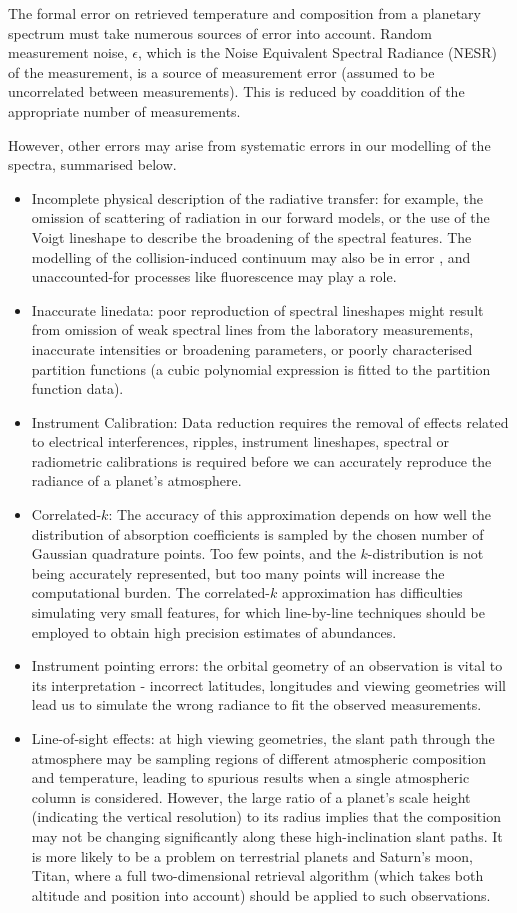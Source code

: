 \documentclass[final,5p,times,twocolumn,authoryear]{elsarticle}
\begin{document}
The formal error on retrieved temperature and composition from a planetary spectrum must take numerous sources of error into account. Random measurement noise, $\epsilon$, which is the Noise Equivalent Spectral Radiance (NESR) of the measurement, is a source of measurement error (assumed to be uncorrelated between measurements).  This is reduced by coaddition of the appropriate number of measurements.

However, other errors may arise from systematic errors in our modelling of the spectra, summarised below.
\begin{itemize}
\item Incomplete physical description of the radiative transfer: for example, the omission of scattering of radiation in our forward models, or the use of the Voigt lineshape to describe the broadening of the spectral features.  The modelling of the collision-induced continuum may also be in error \citep{07orton}, and unaccounted-for processes like fluorescence may play a role.
\item Inaccurate linedata: poor reproduction of spectral lineshapes might result from omission of weak spectral lines from the laboratory measurements, inaccurate intensities or broadening parameters, or poorly characterised partition functions (a cubic polynomial expression is fitted to the partition function data).
\item Instrument Calibration:  Data reduction requires the removal of effects related to electrical interferences, ripples, instrument lineshapes, spectral or radiometric calibrations is required before we can accurately reproduce the radiance of a planet's atmosphere.  
\item Correlated-$k$:  The accuracy of this approximation depends on how well the distribution of absorption coefficients is sampled by the chosen number of Gaussian quadrature points.  Too few points, and the $k$-distribution is not being accurately represented, but too many points will increase the computational burden.  The correlated-$k$ approximation has difficulties simulating very small features, for which line-by-line techniques should be employed to obtain high precision estimates of abundances.
\item Instrument pointing errors: the orbital geometry of an observation is vital to its interpretation - incorrect latitudes, longitudes and viewing geometries will lead us to simulate the wrong radiance to fit the observed measurements.  
\item Line-of-sight effects: at high viewing geometries, the slant path through the atmosphere may be sampling regions of different atmospheric composition and temperature, leading to spurious results when a single atmospheric column is considered.  However, the large ratio of a planet's scale height (indicating the vertical resolution) to its radius implies that the composition may not be changing significantly along these high-inclination slant paths.  It is more likely to be a problem on terrestrial planets and Saturn's moon, Titan, where a full two-dimensional retrieval algorithm (which takes both altitude and position into account) should be applied to such observations.

\end{itemize}
\end{document}
